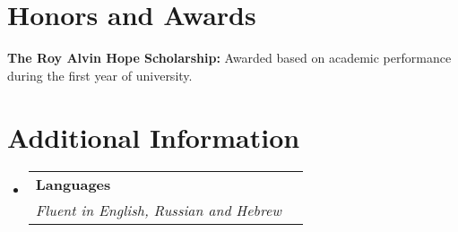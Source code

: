 \documentclass[a4paper,20pt]{article}
\makeatletter
\newcommand{\resumeSubheading}[4]{
	\vspace{-1pt}\item
	\begin{tabular*}{0.97\textwidth}{l@{\extracolsep{\fill}}r}
		\textbf{#1} & #2 \\
		\textit{#3} & \textit{#4} \\
	\end{tabular*}\vspace{-5pt}
}
\newcommand{\resumeSubHeadingListStart}{\begin{itemize}[leftmargin=*]}
\newcommand{\resumeSubHeadingListEnd}{\end{itemize}}
\makeatother
\begin{document}
	\section{Honors and Awards}
	\begin{description}[font=$\bullet$]
		\item {\textbf{The Roy Alvin Hope Scholarship:} Awarded based on academic performance during the first year of university.}
	\end{description}
	
	\vspace{-5pt}
	\section{Additional Information}
	\resumeSubHeadingListStart
	\resumeSubheading
	{Languages}{}
	{Fluent in English, Russian and Hebrew}{}
	\vspace{5pt}
	\resumeSubHeadingListEnd
	
\end{document}
